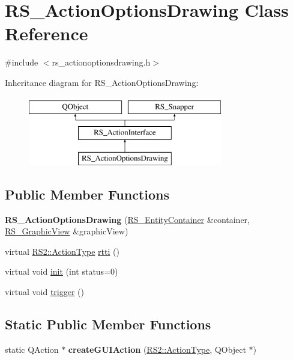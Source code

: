 \hypertarget{classRS__ActionOptionsDrawing}{\section{R\-S\-\_\-\-Action\-Options\-Drawing Class Reference}
\label{classRS__ActionOptionsDrawing}
}


{\ttfamily \#include $<$rs\-\_\-actionoptionsdrawing.\-h$>$}

Inheritance diagram for R\-S\-\_\-\-Action\-Options\-Drawing\-:\begin{figure}[H]
\begin{center}
\leavevmode
\includegraphics[height=3.000000cm]{classRS__ActionOptionsDrawing}
\end{center}
\end{figure}
\subsection*{Public Member Functions}
\begin{DoxyCompactItemize}
\item 
\hypertarget{classRS__ActionOptionsDrawing_ac3da59c647f68c78abc13a579672b1bb}{{\bfseries R\-S\-\_\-\-Action\-Options\-Drawing} (\hyperlink{classRS__EntityContainer}{R\-S\-\_\-\-Entity\-Container} \&container, \hyperlink{classRS__GraphicView}{R\-S\-\_\-\-Graphic\-View} \&graphic\-View)}\label{classRS__ActionOptionsDrawing_ac3da59c647f68c78abc13a579672b1bb}

\item 
virtual \hyperlink{classRS2_afe3523e0bc41fd637b892321cfc4b9d7}{R\-S2\-::\-Action\-Type} \hyperlink{classRS__ActionOptionsDrawing_a045ed6e4bff05d4f68b868da7c5d7f53}{rtti} ()
\item 
virtual void \hyperlink{classRS__ActionOptionsDrawing_a836eaa04ce614c0ec6f458be23274b3f}{init} (int status=0)
\item 
virtual void \hyperlink{classRS__ActionOptionsDrawing_ad398cdf67a4513b57daa92f1c91a2f5a}{trigger} ()
\end{DoxyCompactItemize}
\subsection*{Static Public Member Functions}
\begin{DoxyCompactItemize}
\item 
\hypertarget{classRS__ActionOptionsDrawing_a09f83bfa20caced26c604af15619ac3f}{static Q\-Action $\ast$ {\bfseries create\-G\-U\-I\-Action} (\hyperlink{classRS2_afe3523e0bc41fd637b892321cfc4b9d7}{R\-S2\-::\-Action\-Type}, Q\-Object $\ast$)}\label{classRS__ActionOptionsDrawing_a09f83bfa20caced26c604af15619ac3f}

\end{DoxyCompactItemize}
